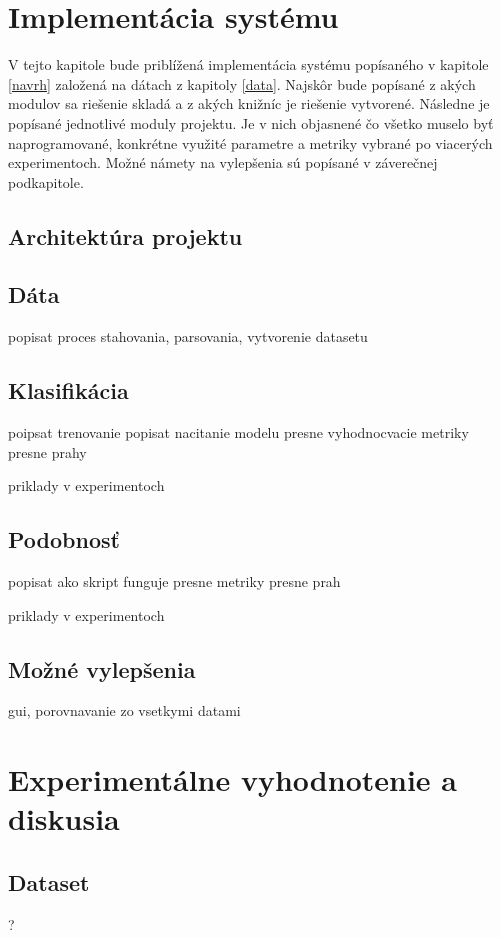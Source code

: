 \chapter{Implementácia systému}
\label{implementacia}
V tejto kapitole bude priblížená implementácia systému popísaného v kapitole \ref{navrh} založená na dátach z kapitoly \ref{data}. Najskôr bude popísané z akých modulov sa riešenie skladá a z akých knižníc je riešenie vytvorené. Následne je popísané jednotlivé moduly projektu. Je v nich objasnené čo všetko muselo byť naprogramované, konkrétne využité parametre a metriky vybrané po viacerých experimentoch. Možné námety na vylepšenia sú popísané v záverečnej podkapitole.  

\section{Architektúra projektu}


\section{Dáta}

popisat proces stahovania, parsovania, vytvorenie datasetu


\section{Klasifikácia}
poipsat trenovanie
popisat nacitanie modelu 
presne vyhodnocvacie metriky
presne prahy

priklady v experimentoch

\section{Podobnosť}
popisat ako skript funguje
presne metriky
presne prah

priklady v experimentoch

\section{Možné vylepšenia}
gui, porovnavanie zo vsetkymi datami

\chapter{Experimentálne vyhodnotenie a diskusia}
\label{experimenty}


\section{Dataset} ?


